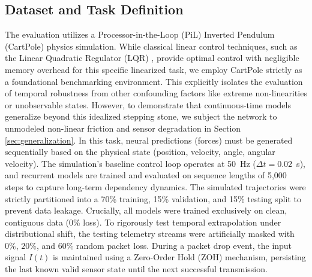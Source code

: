\documentclass[conference]{IEEEtran}
\begin{document}
\subsection{Dataset and Task Definition}
The evaluation utilizes a Processor-in-the-Loop (PiL) Inverted Pendulum (CartPole) \cite{barto1983neuronlike} physics simulation. While classical linear control techniques, such as the Linear Quadratic Regulator (LQR) \cite{astrom2010feedback}, provide optimal control with negligible memory overhead for this specific linearized task, we employ CartPole strictly as a foundational benchmarking environment. This explicitly isolates the evaluation of temporal robustness from other confounding factors like extreme non-linearities or unobservable states. However, to demonstrate that continuous-time models generalize beyond this idealized stepping stone, we subject the network to unmodeled non-linear friction and sensor degradation in Section \ref{sec:generalization}. In this task, neural predictions (forces) must be generated sequentially based on the physical state (position, velocity, angle, angular velocity). The simulation's baseline control loop operates at 50~Hz ($\Delta t = 0.02$~s), and recurrent models are trained and evaluated on sequence lengths of 5,000 steps to capture long-term dependency dynamics. The simulated trajectories were strictly partitioned into a 70\% training, 15\% validation, and 15\% testing split to prevent data leakage. Crucially, all models were trained exclusively on clean, contiguous data (0\% loss). To rigorously test temporal extrapolation under distributional shift, the testing telemetry streams were artificially masked with $0\%$, $20\%$, and $60\%$ random packet loss. During a packet drop event, the input signal $I(t)$ is maintained using a Zero-Order Hold (ZOH) mechanism, persisting the last known valid sensor state until the next successful transmission.
\end{document}
